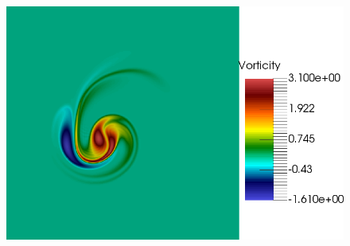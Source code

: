 \begin{figure}[t]
\includegraphics[scale=0.06]{data/Incompressible_Euler/Snapshots/Full_4.png}\\


\end{figure}
